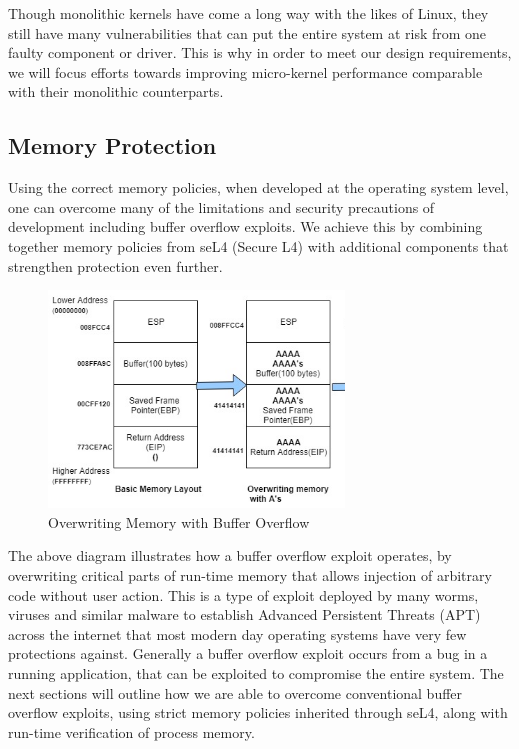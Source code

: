 \documentclass[11pt]{article}
\begin{document}
\noindent Though monolithic kernels have come a long way with the likes of Linux, they still have many vulnerabilities that can put the entire system at risk from one faulty component or driver.
This is why in order to meet our design requirements, we will focus efforts towards improving micro-kernel performance comparable with their monolithic counterparts.


\subsection{Memory Protection}

Using the correct memory policies, when developed at the operating system level, one can overcome many of the limitations and security precautions of development including buffer overflow exploits.
We achieve this by combining together memory policies from seL4 (Secure L4) \cite{seL4} with additional components that strengthen protection even further.

\begin{figure}[h]
    \centering
    \includegraphics[width=0.7\textwidth]{./images/rsz_buffer_overflow.png}
    \caption{Overwriting Memory with Buffer Overflow \cite{buffer-overflow}}
\end{figure}

\noindent The above diagram illustrates how a buffer overflow exploit operates, by overwriting critical parts of run-time memory that allows injection of arbitrary code without user action.
This is a type of exploit deployed by many worms, viruses and similar malware to establish Advanced Persistent Threats (APT) across the internet that most modern day operating systems have very few protections against. 
Generally a buffer overflow exploit occurs from a bug in a running application, that can be exploited to compromise the entire system.
The next sections will outline how we are able to overcome conventional buffer overflow exploits, using strict memory policies inherited through seL4, along with run-time verification of process memory.
\end{document}
